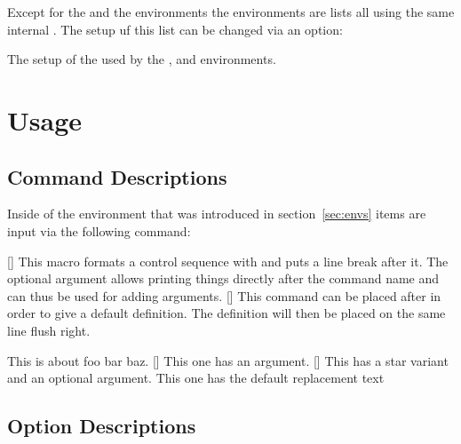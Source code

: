 \documentclass[load-preamble]{cnltx-doc}
\begin{document}
Except for the  and the  environments the
environments are lists all using the same internal .  The setup uf
this list can be changed via an option:

\begin{options}
    The setup of the  used by the ,  and
     environments.
\end{options}

\section{Usage}
\subsection{Command Descriptions}\label{sec:usage:commands}
Inside of the environment  that was introduced in
section~\ref{sec:envs} items are input via the following command:
\begin{commands}
  [\sarg{}]
    This macro formats a control sequence with  and puts a line break
    after it.  The optional argument allows printing things directly after the
    command name and can thus be used for adding arguments.
  []
    This command can be placed after  in order to give a default
    definition.  The definition will then be placed on the same line flush
    right.
\end{commands}
\begin{example}
  \begin{commands}
      This is about foo bar baz.
    []
      This one has an argument.
    [\sarg{}]
      This has a star variant and an optional argument.
      This one has the default replacement text 
  \end{commands}
\end{example}

\subsection{Option Descriptions}\label{sec:usage:options}
\end{document}
